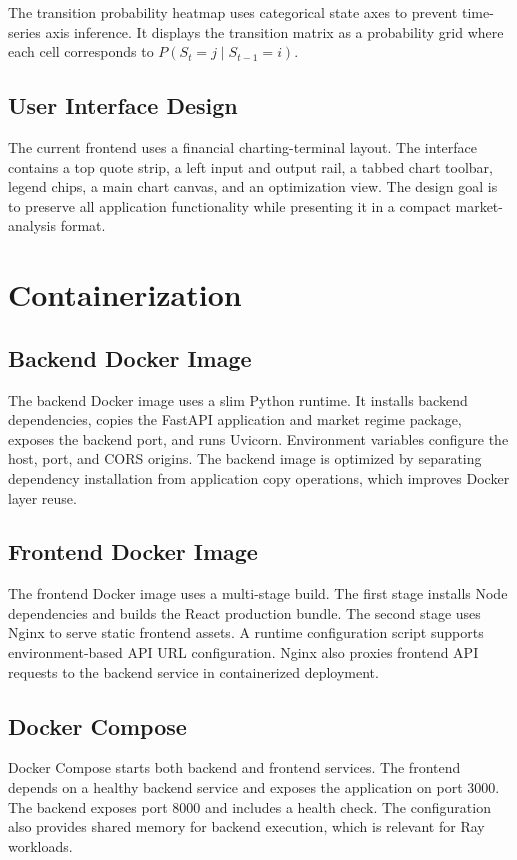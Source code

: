 \documentclass[conference]{IEEEtran}
\begin{document}
The transition probability heatmap uses categorical state axes to prevent time-series axis inference. It displays the transition matrix as a probability grid where each cell corresponds to $P(S_t=j \mid S_{t-1}=i)$.

\subsection{User Interface Design}
The current frontend uses a financial charting-terminal layout. The interface contains a top quote strip, a left input and output rail, a tabbed chart toolbar, legend chips, a main chart canvas, and an optimization view. The design goal is to preserve all application functionality while presenting it in a compact market-analysis format.

\section{Containerization}
\subsection{Backend Docker Image}
The backend Docker image uses a slim Python runtime. It installs backend dependencies, copies the FastAPI application and market regime package, exposes the backend port, and runs Uvicorn. Environment variables configure the host, port, and CORS origins. The backend image is optimized by separating dependency installation from application copy operations, which improves Docker layer reuse.

\subsection{Frontend Docker Image}
The frontend Docker image uses a multi-stage build. The first stage installs Node dependencies and builds the React production bundle. The second stage uses Nginx to serve static frontend assets. A runtime configuration script supports environment-based API URL configuration. Nginx also proxies frontend API requests to the backend service in containerized deployment.

\subsection{Docker Compose}
Docker Compose starts both backend and frontend services. The frontend depends on a healthy backend service and exposes the application on port 3000. The backend exposes port 8000 and includes a health check. The configuration also provides shared memory for backend execution, which is relevant for Ray workloads.
\end{document}
